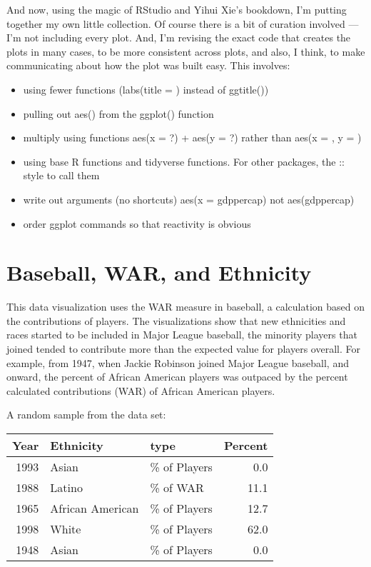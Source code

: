 \documentclass[]{book}
\providecommand{\tightlist}{%
  \setlength{\itemsep}{0pt}\setlength{\parskip}{0pt}}
\theoremstyle{definition}
\theoremstyle{definition}
\theoremstyle{definition}
\theoremstyle{remark}
\begin{document}
And now, using the magic of RStudio and Yihui Xie's bookdown, I'm
putting together my own little collection. Of course there is a bit of
curation involved --- I'm not including every plot. And, I'm revising
the exact code that creates the plots in many cases, to be more
consistent across plots, and also, I think, to make communicating about
how the plot was built easy. This involves:

\begin{itemize}
\tightlist
\item
  using fewer functions (labs(title = ) instead of ggtitle())
\item
  pulling out aes() from the ggplot() function
\item
  multiply using functions aes(x = ?) + aes(y = ?) rather than aes(x = ,
  y = )
\item
  using base R functions and tidyverse functions. For other packages,
  the :: style to call them
\item
  write out arguments (no shortcuts) aes(x = gdppercap) not
  aes(gdppercap)
\item
  order ggplot commands so that reactivity is obvious
\end{itemize}

\chapter{Baseball, WAR, and Ethnicity}\label{baseball-war-and-ethnicity}

This data visualization uses the WAR measure in baseball, a calculation
based on the contributions of players. The visualizations show that new
ethnicities and races started to be included in Major League baseball,
the minority players that joined tended to contribute more than the
expected value for players overall. For example, from 1947, when Jackie
Robinson joined Major League baseball, and onward, the percent of
African American players was outpaced by the percent calculated
contributions (WAR) of African American players.

A random sample from the data set:

\begin{tabular}{r|l|l|r}
\hline
Year & Ethnicity & type & Percent\\
\hline
1993 & Asian & \% of Players & 0.0\\
\hline
1988 & Latino & \% of WAR & 11.1\\
\hline
1965 & African American & \% of Players & 12.7\\
\hline
1998 & White & \% of Players & 62.0\\
\hline
1948 & Asian & \% of Players & 0.0\\
\hline
\end{tabular}
\end{document}
